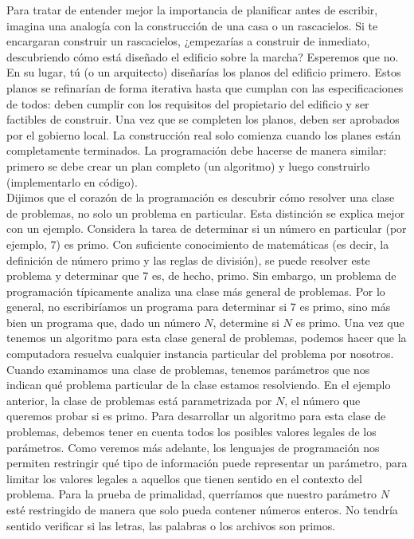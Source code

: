\documentclass[12pt]{article}
\begin{document}
Para tratar de entender mejor la importancia de planificar antes de escribir, imagina una analogía con la construcción de una casa o un rascacielos. 
Si te encargaran construir un rascacielos, ¿empezarías a construir de inmediato, descubriendo cómo está diseñado el edificio sobre la marcha? Esperemos que no. En su lugar, tú (o un arquitecto) diseñarías los planos del edificio primero. Estos planos se refinarían de forma iterativa hasta que cumplan con las especificaciones de todos: deben cumplir con los requisitos del propietario del edificio y ser factibles de construir. Una vez que se completen los planos, deben ser aprobados por el gobierno local. La construcción real solo comienza cuando los planes están completamente terminados. La programación debe hacerse de manera similar: primero se debe crear un plan completo (un algoritmo) y luego construirlo (implementarlo en código).\\

Dijimos que el corazón de la programación es descubrir cómo resolver una clase de problemas, no solo un problema en particular. 
Esta distinción se explica mejor con un ejemplo. Considera la tarea de determinar si un número en particular (por ejemplo, $7$) es primo. Con suficiente conocimiento de matemáticas (es decir, la definición de número primo y las reglas de división), se puede resolver este problema y determinar que $7$ es, de hecho, primo. 
Sin embargo, un problema de programación típicamente analiza una clase más general de problemas. Por lo general, no escribiríamos un programa para determinar si $7$ es primo, sino más bien un programa que, dado un número $N$, determine si $N$ es primo. Una vez que tenemos un algoritmo para esta clase general de problemas, podemos hacer que la computadora resuelva cualquier instancia particular del problema por nosotros.\\

Cuando examinamos una clase de problemas, tenemos parámetros que nos indican qué problema particular de la clase estamos resolviendo. 
En el ejemplo anterior, la clase de problemas está parametrizada por $N$, el número que queremos probar si es primo. Para desarrollar un algoritmo para esta clase de problemas, debemos tener en cuenta todos los posibles valores legales de los parámetros. Como veremos más adelante, los lenguajes de programación nos permiten restringir qué tipo de información puede representar un parámetro, para limitar los valores legales a aquellos que tienen 
sentido en el contexto del problema. Para la prueba de primalidad, querríamos que nuestro parámetro $N$ esté restringido de manera que solo pueda contener números enteros. No tendría sentido verificar si las letras, las palabras o los archivos son primos.\\
\end{document}

